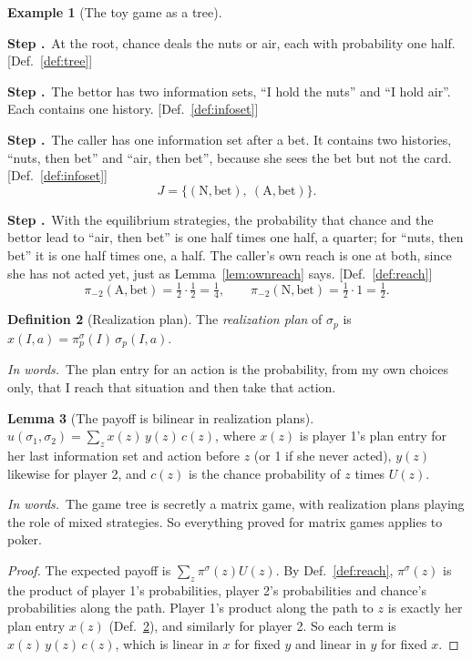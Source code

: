 \documentclass[11pt]{article}
\theoremstyle{definition}
\newtheorem{definition}{Definition}[section]
\newtheorem{example}[definition]{Example}
\newtheorem{lemma}[definition]{Lemma}
\newcommand{\inwords}{\par\smallskip\noindent\textit{In words.}\ }
\newcounter{stp}
\newcommand{\steps}{\setcounter{stp}{0}}
\newcommand{\st}{\stepcounter{stp}\par\medskip\noindent\textbf{Step \arabic{stp}.}\ }
\newcommand{\by}[1]{\hfill{\small\color{blue!50!black}[#1]}}
\newcommand{\Def}[1]{Def.~\ref{#1}}\newcommand{\Lem}[1]{Lemma~\ref{#1}}\newcommand{\Thm}[1]{Thm.~\ref{#1}}
\begin{document}
\begin{example}[The toy game as a tree]\label{ex:toytree}
\steps
\st At the root, chance deals the nuts or air, each with probability one half. \by{\Def{def:tree}}
\st The bettor has two information sets, ``I hold the nuts'' and ``I hold air''. Each contains one history.
\by{\Def{def:infoset}}
\st The caller has one information set after a bet. It contains two histories, ``nuts, then bet'' and ``air, then bet'',
because she sees the bet but not the card. \by{\Def{def:infoset}}
\[ J=\{(\text{N},\text{bet}),\ (\text{A},\text{bet})\}. \]
\st With the equilibrium strategies, the probability that chance and the bettor lead to ``air, then bet'' is one half
times one half, a quarter; for ``nuts, then bet'' it is one half times one, a half. The caller's own reach is one at both,
since she has not acted yet, just as \Lem{lem:ownreach} says. \by{\Def{def:reach}}
\[ \pi_{-2}(\text{A},\text{bet})=\tfrac12\cdot\tfrac12=\tfrac14,\qquad \pi_{-2}(\text{N},\text{bet})=\tfrac12\cdot1=\tfrac12. \]
\end{example}

\begin{definition}[Realization plan]\label{def:plan}
The \emph{realization plan} of $\sigma_p$ is $x(I,a)=\pi_p^\sigma(I)\,\sigma_p(I,a)$.
\inwords The plan entry for an action is the probability, from my own choices only, that I reach that situation and
then take that action.
\end{definition}

\begin{lemma}[The payoff is bilinear in realization plans]\label{lem:seqbilinear}
$u(\sigma_1,\sigma_2)=\sum_zx(z)\,y(z)\,c(z)$, where $x(z)$ is player 1's plan entry for her last information set and action
before $z$ (or 1 if she never acted), $y(z)$ likewise for player 2, and $c(z)$ is the chance probability of $z$ times $U(z)$.
\inwords The game tree is secretly a matrix game, with realization plans playing the role of mixed strategies. So
everything proved for matrix games applies to poker.
\end{lemma}
\begin{proof}
The expected payoff is $\sum_z\pi^\sigma(z)U(z)$. By \Def{def:reach}, $\pi^\sigma(z)$ is the product of player 1's
probabilities, player 2's probabilities and chance's probabilities along the path. Player 1's product along the path to
$z$ is exactly her plan entry $x(z)$ (\Def{def:plan}), and similarly for player 2. So each term is $x(z)\,y(z)\,c(z)$,
which is linear in $x$ for fixed $y$ and linear in $y$ for fixed $x$.
\end{proof}
\end{document}

